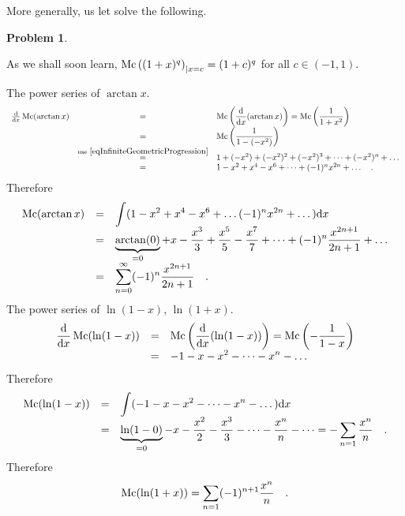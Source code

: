 \documentclass[12pt]{book}
\newtheorem{problem}[theorem]{Problem}
\begin{document}
More generally, us let solve the following.
\begin{problem}

\end{problem}


As we shall soon learn, $\operatorname{{\normalfont{Mc}}} \left( (1+x)^q\right)_{|x=c} =(1+c)^q $   for all $c\in (-1, 1)$.

The power series of $\arctan x$.
\[
\begin{array}{rcl}
\frac{{\normalfont \text{d}}}{{\normalfont \text{d}} x}\operatorname{{\normalfont{Mc}}} (\arctan x)&=& \displaystyle \operatorname{{\normalfont{Mc}}}\left( \frac{{\normalfont \text{d}}}{{\normalfont \text{d}} x}(\arctan x)\right)= \operatorname{{\normalfont{Mc}}} \left(\frac{1}{1+x^2}\right) \\
&=&\displaystyle \operatorname{{\normalfont{Mc}}} \left(\frac{1}{1-(-x^2)}\right)\\
& \stackrel{\mathrm{use~} \eqref{eqInfiniteGeometricProgression} }{=} & 1+(-x^2)+(-x^2)^2+(-x^2)^3+\dots+ (-x^2)^n+\dots
\\ &=& 1-x^2+x^4-x^6+\dots+ (-1)^nx^{2n}+\dots \quad .
\end{array}
\]
Therefore
\[
\begin{array}{rcl}
\operatorname{{\normalfont{Mc}}} (\arctan x)&=&\displaystyle \int( 1-x^2+x^4-x^6+\dots (-1)^nx^{2n} + \dots ){\normalfont \text{d}} x \\
&=&\displaystyle  \underbrace{\arctan(0)}_{=0}+ x- \frac{ x^3}3 + \frac{ x^5}5 -\frac{ x^7}7+\dots +(-1)^n\frac{x^{2n+1}}{2n+1}+\dots\\
&=&\displaystyle  \sum_{n=0}^{\infty} (-1)^n\frac{x^{2n+1}}{2n+1}\quad .
\end{array}
\]
The power series of $\ln (1-x)$, $\ln(1+x)$.
\[
\begin{array}{rcl}
\displaystyle \frac{{\normalfont \text{d}}}{{\normalfont \text{d}} x}\operatorname{{\normalfont{Mc}}}(\ln (1-x))&=& \displaystyle \operatorname{{\normalfont{Mc}}} \left(\frac{{\normalfont \text{d}}}{{\normalfont \text{d}} x}(\ln (1-x))\right) = \operatorname{{\normalfont{Mc}}} \left( - \frac{ 1}{1-x}\right)\\
&=& \displaystyle -1-x-x^2-\dots -x^n-\dots
\end{array}
\]
Therefore
\[
\begin{array}{rcl}
\displaystyle \operatorname{{\normalfont{Mc}}}(\ln (1-x) )&=&\displaystyle \int (-1-x-x^2-\dots -x^n - \dots){\normalfont \text{d}} x \\&=&\displaystyle \underbrace{\ln (1-0)}_{=0} - x- \frac{ x^2 }{ 2}- \frac{x^3}{3}-\dots - \frac{x^n}{n}-\dots= -\displaystyle\sum_{ n=1} \frac{ x^n}{n} \quad .
\end{array}
\]
Therefore
\[
\operatorname{{\normalfont{Mc}}}(\ln (1+x) )=\sum_{n=1}(-1)^{n+1}\frac{x^n}{n}\quad .
\]
\end{document}
